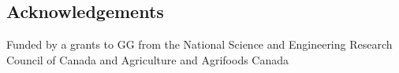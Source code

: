 \documentclass[a0,portrait]{a0poster}
\begin{document}
\begin{multicols}{2}
\color{DarkSlateGray} %
\vspace{-1cm}
\nocite{*} %


\vspace{-1cm}
\section*{Acknowledgements}

Funded by a grants to GG from the National Science and Engineering Research Council of Canada and Agriculture and Agrifoods Canada

\end{multicols}
\end{document}

